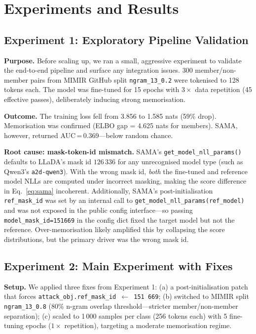 \documentclass{article}
\begin{document}
\section{Experiments and Results}
\label{sec:experiments}

\subsection{Experiment 1: Exploratory Pipeline Validation}

\textbf{Purpose.}  Before scaling up, we ran a small, aggressive experiment to
validate the end-to-end pipeline and surface any integration issues.
300 member/non-member pairs from MIMIR GitHub split
\texttt{ngram\_13\_0.2} were tokenised to 128 tokens each.
The model was fine-tuned for 15 epochs with $3\times$ data repetition
(45 effective passes), deliberately inducing strong memorisation.

\textbf{Outcome.}  The training loss fell from 3.856 to 1.585 nats (59\% drop).
Memorisation was confirmed (ELBO gap = 4.625 nats for members).
SAMA, however, returned AUC\,=\,0.369---below random chance.

\textbf{Root cause: mask-token-id mismatch.}
SAMA's \texttt{get\_model\_nll\_params()} defaults to LLaDA's mask id
$126\,336$ for any unrecognised model type (such as Qwen3's
\texttt{a2d-qwen3}).  With the wrong mask id, \emph{both} the fine-tuned and
reference model NLLs are computed under incorrect masking, making the score
difference in Eq.~\ref{eq:sama} incoherent.
Additionally, SAMA's post-initialisation \texttt{ref\_mask\_id} was set by
an internal call to \texttt{get\_model\_nll\_params(ref\_model)} and was not
exposed in the public config interface---so passing
\texttt{model\_mask\_id=151669} in the config dict fixed the target model
but not the reference.
Over-memorisation likely amplified this by collapsing the score distributions,
but the primary driver was the wrong mask id.

\subsection{Experiment 2: Main Experiment with Fixes}

\textbf{Setup.}
We applied three fixes from Experiment 1:
(a) a post-initialisation patch that forces
\texttt{attack\_obj.ref\_mask\_id\,$\leftarrow$\,151\,669};
(b) switched to MIMIR split \texttt{ngram\_13\_0.8} (80\% n-gram
overlap threshold---stricter member/non-member separation);
(c) scaled to 1\,000 samples per class (256 tokens each) with 5 fine-tuning
epochs ($1\times$ repetition), targeting a moderate memorisation regime.
\end{document}
